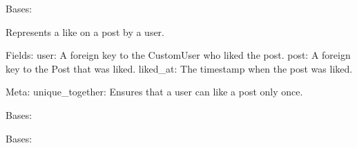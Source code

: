 \documentclass[letterpaper,10pt,english]{sphinxmanual}
\begin{document}
\begin{fulllineitems}
\label{\detokenize{modules/models:interactions.models.Like}}
\pysigstartsignatures
{}
\pysigstopsignatures
\sphinxAtStartPar
Bases: 

\sphinxAtStartPar
Represents a like on a post by a user.

\sphinxAtStartPar
Fields:
\sphinxhyphen{} user: A foreign key to the CustomUser who liked the post.
\sphinxhyphen{} post: A foreign key to the Post that was liked.
\sphinxhyphen{} liked\_at: The timestamp when the post was liked.

\sphinxAtStartPar
Meta:
\sphinxhyphen{} unique\_together: Ensures that a user can like a post only once.

\begin{fulllineitems}
\label{\detokenize{modules/models:interactions.models.Like.DoesNotExist}}
\pysigstartsignatures
{}
\pysigstopsignatures
\sphinxAtStartPar
Bases: 

\end{fulllineitems}


\begin{fulllineitems}
\label{\detokenize{modules/models:interactions.models.Like.MultipleObjectsReturned}}
\pysigstartsignatures
{}
\pysigstopsignatures
\sphinxAtStartPar
Bases: 

\end{fulllineitems}


\end{fulllineitems}

\end{document}
